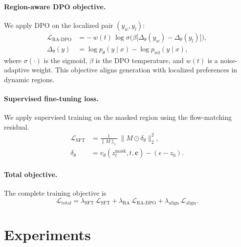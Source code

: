 \documentclass{article}
\begin{document}
\paragraph{Region-aware DPO objective.}
We apply DPO on the localized pair $(y_w,y_l)$:
\begin{equation}
\label{eq:ra_dpo}
\begin{aligned}
\mathcal{L}_{\mathrm{RA\mbox{-}DPO}}
&= -\, w(t)\,
\log \sigma\!\Big(
\beta \big[
\Delta_\theta(y_w) - \Delta_\theta(y_l)
\big]
\Big), \\
\Delta_\theta(y)
&= \log p_\theta(y\mid x) - \log p_{\mathrm{ref}}(y\mid x),
\end{aligned}
\end{equation}
where $\sigma(\cdot)$ is the sigmoid, $\beta$ is the DPO temperature, and $w(t)$ is a noise-adaptive weight. This objective aligns generation with localized preferences in dynamic regions.


\paragraph{Supervised fine-tuning loss.}
We apply supervised training on the masked region using the flow-matching residual.
\begin{equation}
\label{eq:sft_loss}
\begin{aligned}
\mathcal{L}_{\mathrm{SFT}}
&= \frac{1}{\lVert M\rVert_{1}}\,
\big\lVert M \odot \delta_\theta \big\rVert_2^{2}, \\
\delta_\theta
&= v_\theta(z_t^{\mathrm{mask}}, t, \mathbf{c}) - (\epsilon - z_0).
\end{aligned}
\end{equation}

\paragraph{Total objective.}
The complete training objective is
\begin{equation}
\label{eq:total_loss}
\mathcal{L}_{\mathrm{total}}
= \lambda_{\mathrm{SFT}}\,\mathcal{L}_{\mathrm{SFT}}
+ \lambda_{\mathrm{RA}}\,\mathcal{L}_{\mathrm{RA\mbox{-}DPO}}
+ \lambda_{\mathrm{align}}\,\mathcal{L}_{\mathrm{align}}.
\end{equation}

\section{Experiments}
\label{sec:experiments}
\end{document}
